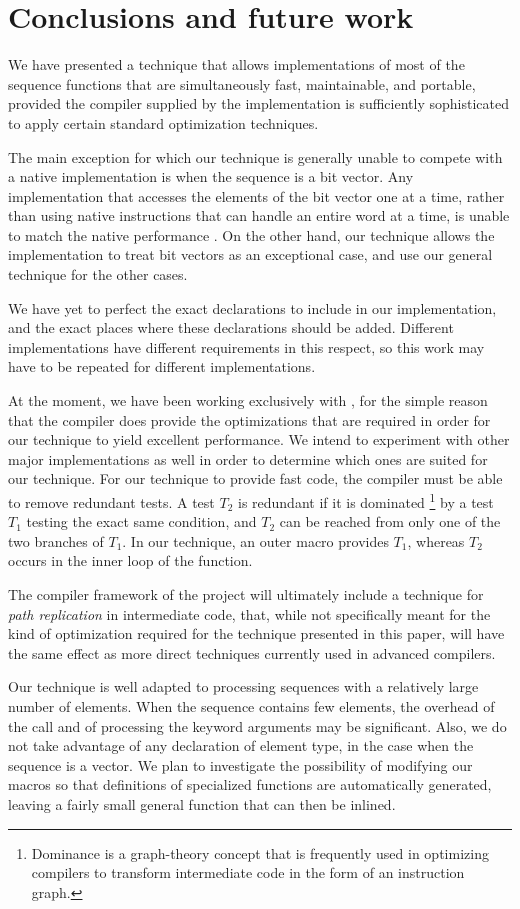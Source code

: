 \section{Conclusions and future work}
\label{sec-conclusions}

We have presented a technique that allows implementations of most of
the \commonlisp{} sequence functions that are simultaneously fast,
maintainable, and portable, provided the compiler supplied by the
implementation is sufficiently sophisticated to apply certain standard
optimization techniques.

The main exception for which our technique is generally unable to
compete with a native implementation is when the sequence is a bit
vector.  Any implementation that accesses the elements of the bit
vector one at a time, rather than using native instructions that can
handle an entire word at a time, is unable to match the native
performance \cite{Baker:1990:EIB:121989.121991}.  On the other hand,
our technique allows the \commonlisp{} implementation to treat bit
vectors as an exceptional case, and use our general technique for the
other cases.

We have yet to perfect the exact declarations to include in our
implementation, and the exact places where these declarations should
be added.  Different \commonlisp{} implementations have different
requirements in this respect, so this work may have to be repeated for
different implementations.

At the moment, we have been working exclusively with \sbcl{}, for the
simple reason that the \sbcl{} compiler does provide the optimizations
that are required in order for our technique to yield excellent
performance.  We intend to experiment with other major implementations
as well in order to determine which ones are suited for our
technique.  For our technique to provide fast code, the compiler must
be able to remove redundant tests.  A test $T_2$ is redundant if it is
dominated%
\footnote{Dominance is a graph-theory concept that is frequently used
  in optimizing compilers to transform intermediate code in the form
  of an instruction graph.}
by a test $T_1$ testing the exact same condition, and $T_2$ can be
reached from only one of the two branches of $T_1$.  In our technique,
an outer macro provides $T_1$, whereas $T_2$ occurs in the inner loop
of the function.

The \cleavir{} compiler framework of the \sicl{} project will
ultimately include a technique for \emph{path replication} in
intermediate code, that, while not specifically meant for the kind of
optimization required for the technique presented in this paper, will
have the same effect as more direct techniques currently used in
advanced compilers.

Our technique is well adapted to processing sequences with a
relatively large number of elements.  When the sequence contains few
elements, the overhead of the call and of processing the keyword
arguments may be significant.  Also, we do not take advantage of any
declaration of element type, in the case when the sequence is a
vector.  We plan to investigate the possibility of modifying our
macros so that definitions of specialized functions are automatically
generated, leaving a fairly small general function that can then be
inlined.
